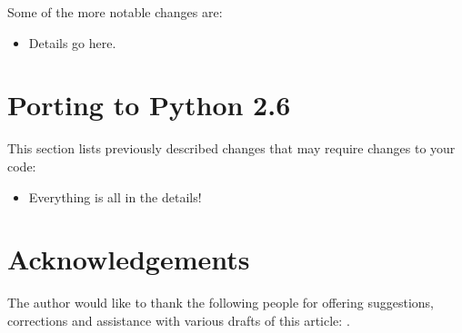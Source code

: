 \documentclass{howto}
\begin{document}
Some of the more notable changes are:

\begin{itemize}

\item Details go here.

\end{itemize}


\section{Porting to Python 2.6}

This section lists previously described changes that may require
changes to your code:

\begin{itemize}

\item Everything is all in the details!

\end{itemize}


\section{Acknowledgements \label{acks}}

The author would like to thank the following people for offering
suggestions, corrections and assistance with various drafts of this
article: .
\end{document}
